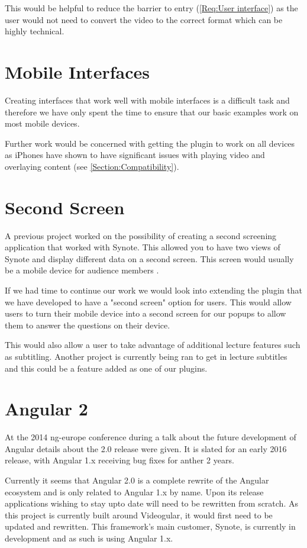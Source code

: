 This would be helpful to reduce the barrier to entry (\cref{Req:User interface}) as the user would not need to convert the video to the correct format which can be highly technical.

\section{Mobile Interfaces}

Creating interfaces that work well with mobile interfaces is a difficult task and therefore we have only spent the time to ensure that our basic examples work on most mobile devices.

Further work would be concerned with getting the plugin to work on all devices as iPhones have shown to have significant issues with playing video and overlaying content (see \autoref{Section:Compatibility}).

\section{Second Screen}

A previous project  worked on the possibility of creating a second screening application that worked with Synote. This allowed you to have two views of Synote and display different data on a second screen. This screen would usually be a mobile device for audience members .

If we had time to continue our work we would look into extending the plugin that we have developed to have a "second screen" option for users. This would allow users to turn their mobile device into a second screen for our popups to allow them to answer the questions on their device.

This would also allow a user to take advantage of additional lecture features such as subtitling. Another project is currently being ran to get in lecture subtitles and this could be a feature added as one of our plugins.

\section{Angular 2}

At the 2014 ng-europe conference during a talk about the future development of Angular details about the 2.0 release were given. It is slated for an early 2016 release, with Angular 1.x receiving bug fixes for anther 2 years.

Currently it seems that Angular 2.0 is a complete rewrite of the Angular ecosystem and is only related to Angular 1.x by name. Upon its release applications wishing to stay upto date will need to be rewritten from scratch. As this project is currently built around Videogular, it would first need to be updated and rewritten. This framework's main customer, Synote, is currently in development and as such is using Angular 1.x. 

